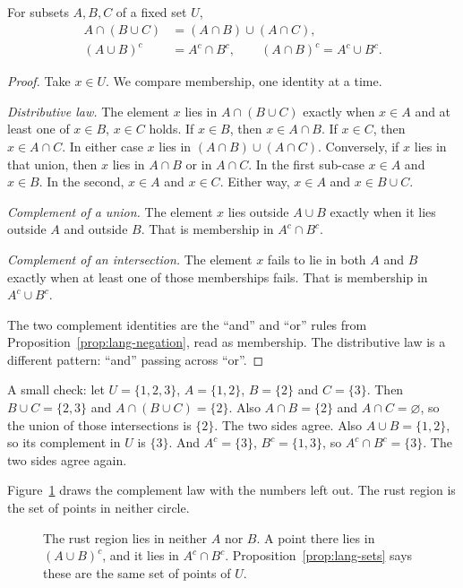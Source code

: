 \begin{proposition}\label{prop:lang-sets}
For subsets $A,B,C$ of a fixed set $U$,
\begin{align*}
A\cap(B\cup C)&=(A\cap B)\cup(A\cap C),\\
(A\cup B)^c&=A^c\cap B^c,\qquad
(A\cap B)^c=A^c\cup B^c.
\end{align*}
\end{proposition}
\begin{proof}
Take $x\in U$. We compare membership, one identity at a time.

\emph{Distributive law.} The element $x$ lies in $A\cap(B\cup C)$ exactly when $x\in A$ and at least one of $x\in B$, $x\in C$ holds. If $x\in B$, then $x\in A\cap B$. If $x\in C$, then $x\in A\cap C$. In either case $x$ lies in $(A\cap B)\cup(A\cap C)$. Conversely, if $x$ lies in that union, then $x$ lies in $A\cap B$ or in $A\cap C$. In the first sub-case $x\in A$ and $x\in B$. In the second, $x\in A$ and $x\in C$. Either way, $x\in A$ and $x\in B\cup C$.

\emph{Complement of a union.} The element $x$ lies outside $A\cup B$ exactly when it lies outside $A$ and outside $B$. That is membership in $A^c\cap B^c$.

\emph{Complement of an intersection.} The element $x$ fails to lie in both $A$ and $B$ exactly when at least one of those memberships fails. That is membership in $A^c\cup B^c$.

The two complement identities are the ``and'' and ``or'' rules from Proposition~\ref{prop:lang-negation}, read as membership. The distributive law is a different pattern: ``and'' passing across ``or''.
\end{proof}

A small check: let $U=\{1,2,3\}$, $A=\{1,2\}$, $B=\{2\}$ and $C=\{3\}$. Then $B\cup C=\{2,3\}$ and $A\cap(B\cup C)=\{2\}$. Also $A\cap B=\{2\}$ and $A\cap C=\varnothing$, so the union of those intersections is $\{2\}$. The two sides agree. Also $A\cup B=\{1,2\}$, so its complement in $U$ is $\{3\}$. And $A^c=\{3\}$, $B^c=\{1,3\}$, so $A^c\cap B^c=\{3\}$. The two sides agree again.

Figure~\ref{fig:lang-demorgan} draws the complement law with the numbers left out. The rust region is the set of points in neither circle.

\begin{figure}[ht]
\centering
{}
\caption{The rust region lies in neither $A$ nor $B$. A point there lies in $(A\cup B)^c$, and it lies in $A^c\cap B^c$. Proposition~\ref{prop:lang-sets} says these are the same set of points of $U$.}
\label{fig:lang-demorgan}
\end{figure}


